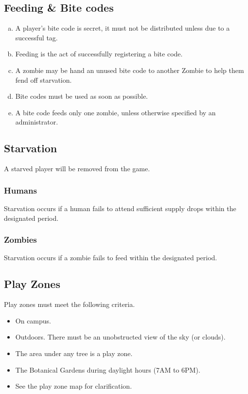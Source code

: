 \documentclass[a4paper,12pt]{article}
\begin{document}
\subsection{Feeding \& Bite codes}

\begin{enumerate}[(a)]
    \item A player's bite code is secret, it must not be distributed unless due to a successful tag.
    \item Feeding is the act of successfully registering a bite code.
    \item A zombie may be hand an unused bite code to another Zombie to help them fend off starvation.
    \item Bite codes must be used as soon as possible.
    \item A bite code feeds only one zombie, unless otherwise specified by an administrator.
\end{enumerate}

\subsection{Starvation}
A starved player will be removed from the game.
    \subsubsection{Humans}
    Starvation occurs if a human fails to attend sufficient supply drops within the designated period.

    \subsubsection{Zombies}
    Starvation occurs if a zombie fails to feed within the designated period.

\subsection{Play Zones}
Play zones must meet the following criteria.
\begin{itemize}
    \item On campus.
    \item Outdoors. There must be an unobstructed view of the sky (or clouds).
    \item The area under any tree is a play zone.
    \item The Botanical Gardens during daylight hours (7AM to 6PM).
    \item See the play zone map for clarification.
\end{itemize}
\end{document}
